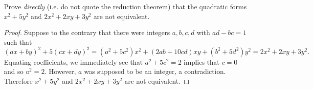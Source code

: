 \documentclass[10pt]{amsart}
\begin{document}
\begin{thm}
  Prove {\it directly} (i.e. do not quote the reduction theorem) that the quadratic forms $x^2 + 5y^2$ and $2x^2 + 2xy + 3y^2$ are not equivalent.
  
  \begin{proof}
    Suppose to the contrary that there were integers $a,b,c,d$ with $ad - bc = 1$ such that
    $$(ax + by)^2 + 5(cx + dy)^2 = (a^2 + 5c^2)x^2 + (2ab + 10cd)xy + (b^2 + 5d^2)y^2 = 2x^2 + 2xy + 3y^2.$$
    Equating coefficients, we immediately see that $a^2 + 5c^2 = 2$ implies that $c = 0$ and so $a^2 = 2$.
    However, $a$ was supposed to be an integer, a contradiction.
    Therefore $x^2 + 5y^2$ and $2x^2 + 2xy + 3y^2$ are not equivalent.
  \end{proof}
\end{thm}
\end{document}

